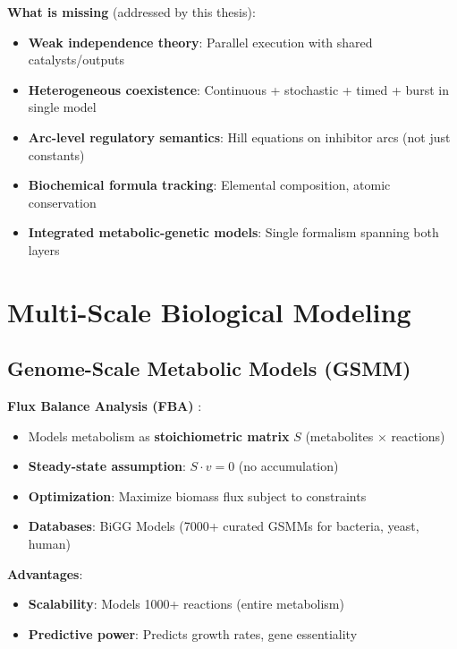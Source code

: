 \textbf{What is missing} (addressed by this thesis):

\begin{itemize}
    \item[$\times$] \textbf{Weak independence theory}: Parallel execution with shared catalysts/outputs
    \item[$\times$] \textbf{Heterogeneous coexistence}: Continuous + stochastic + timed + burst in single model
    \item[$\times$] \textbf{Arc-level regulatory semantics}: Hill equations on inhibitor arcs (not just constants)
    \item[$\times$] \textbf{Biochemical formula tracking}: Elemental composition, atomic conservation
    \item[$\times$] \textbf{Integrated metabolic-genetic models}: Single formalism spanning both layers
\end{itemize}

\section{Multi-Scale Biological Modeling}
\label{sec:multiscale-modeling}

\subsection{Genome-Scale Metabolic Models (GSMM)}
\label{subsec:gsmm}

\textbf{Flux Balance Analysis (FBA)} \citep{Varma1994}:

\begin{itemize}
    \item Models metabolism as \textbf{stoichiometric matrix} $S$ (metabolites $\times$ reactions)
    \item \textbf{Steady-state assumption}: $S \cdot v = 0$ (no accumulation)
    \item \textbf{Optimization}: Maximize biomass flux subject to constraints
    \item \textbf{Databases}: BiGG Models (7000+ curated GSMMs for bacteria, yeast, human)
\end{itemize}

\textbf{Advantages}:

\begin{itemize}
    \item \textbf{Scalability}: Models 1000+ reactions (entire metabolism)
    \item \textbf{Predictive power}: Predicts growth rates, gene essentiality
\end{itemize}

